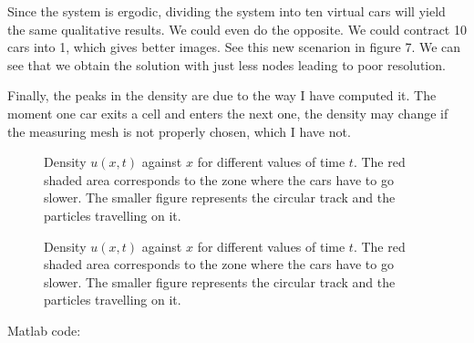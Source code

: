 \begin{questions}
\begin{solution}
Since the system is ergodic, dividing the system into ten virtual cars will yield the same qualitative results. We could even do the opposite. We could contract 10 cars into 1, which gives better images. See this new scenarion in figure 7. We can see that we obtain the solution with just less nodes leading to poor resolution.

Finally, the peaks in the density are due to the way I have computed it. The moment one car exits a cell and enters the next one, the density may change if the measuring mesh is not properly chosen, which I have not.

\begin{figure}[H]
\centering     %
{}
\hspace{-0.9cm}
\hspace{-0.9cm}
\hspace{-0.9cm}
\hspace{-0.9cm}
\hspace{-0.9cm}

\caption{Density $u(x,t)$ against $x$ for different values of time $t$. The red shaded area corresponds to the zone where the cars have to go slower. The smaller figure represents the circular track and the particles travelling on it.} 
\end{figure}

\begin{figure}[H]
\centering     %
{}
\hspace{-0.9cm}
\hspace{-0.9cm}
\hspace{-0.9cm}
\hspace{-0.9cm}
\hspace{-0.9cm}

\caption{Density $u(x,t)$ against $x$ for different values of time $t$. The red shaded area corresponds to the zone where the cars have to go slower. The smaller figure represents the circular track and the particles travelling on it.} 
\end{figure}
Matlab code:

\end{solution}
\end{questions}